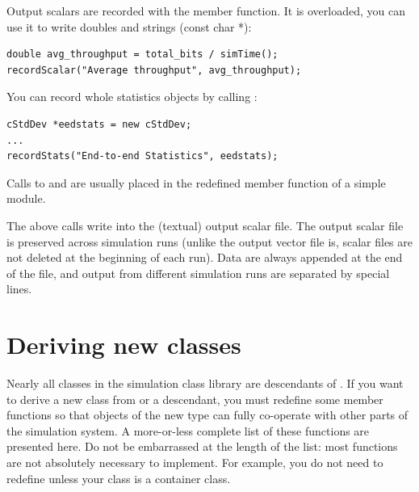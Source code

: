 Output scalars are recorded with the  member
function.  It is overloaded, you can use it to write doubles and
strings (const char *):

\begin{verbatim}
double avg_throughput = total_bits / simTime();
recordScalar("Average throughput", avg_throughput);
\end{verbatim}


You can record whole statistics objects by calling :

\begin{verbatim}
cStdDev *eedstats = new cStdDev;
...
recordStats("End-to-end Statistics", eedstats);
\end{verbatim}



Calls to  and  are usually
placed in the redefined  member function of a
simple module.


The above calls write into the (textual) output scalar file.  The
output scalar file is preserved across simulation runs (unlike the
output vector file is, scalar files are not deleted at the beginning
of each run). Data are always appended at the end of the file, and
output from different simulation runs are separated by special lines.





\section{Deriving new classes}

Nearly all classes in the simulation class library are descendants of
. If you want to derive a new class from
 or a  descendant, you must redefine
some member functions so that objects of the new type can fully
co-operate with other parts of the simulation system. A more-or-less
complete list of these functions are presented here. Do not be
embarrassed at the length of the list: most functions are not
absolutely necessary to implement. For example, you do not need to
redefine  unless your class is a container class.

